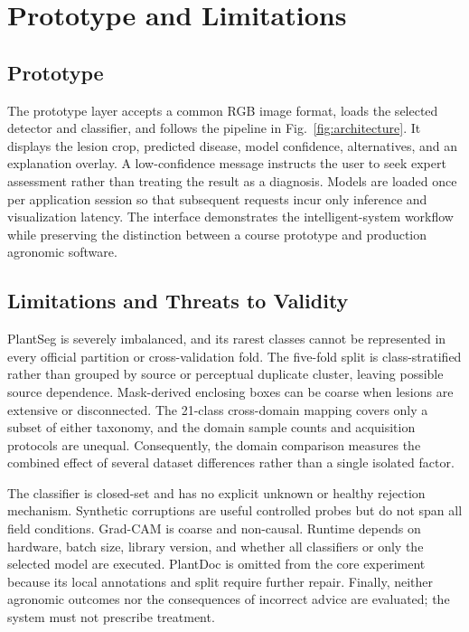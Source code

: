 \documentclass[conference]{IEEEtran}
\begin{document}
\section{Prototype and Limitations}

\subsection{Prototype}

The prototype layer accepts a common RGB image format, loads the selected detector and classifier,
and follows the pipeline in Fig.~\ref{fig:architecture}. It displays the lesion crop, predicted
disease, model confidence, alternatives, and an explanation overlay. A low-confidence message
instructs the user to seek expert assessment rather than treating the result as a diagnosis. Models
are loaded once per application session so that subsequent requests incur only inference and
visualization latency. The interface demonstrates the intelligent-system workflow while preserving
the distinction between a course prototype and production agronomic software.

\subsection{Limitations and Threats to Validity}

PlantSeg is severely imbalanced, and its rarest classes cannot be represented in every official
partition or cross-validation fold. The five-fold split is class-stratified rather than grouped by
source or perceptual duplicate cluster, leaving possible source dependence. Mask-derived enclosing
boxes can be coarse when lesions are extensive or disconnected. The 21-class cross-domain mapping
covers only a subset of either taxonomy, and the domain sample counts and acquisition protocols are
unequal. Consequently, the domain comparison measures the combined effect of several dataset
differences rather than a single isolated factor.

The classifier is closed-set and has no explicit unknown or healthy rejection mechanism. Synthetic
corruptions are useful controlled probes but do not span all field conditions. Grad-CAM is coarse
and non-causal. Runtime depends on hardware, batch size, library version, and whether all classifiers
or only the selected model are executed. PlantDoc is omitted from the core experiment because its
local annotations and split require further repair. Finally, neither agronomic outcomes nor the
consequences of incorrect advice are evaluated; the system must not prescribe treatment.
\end{document}
